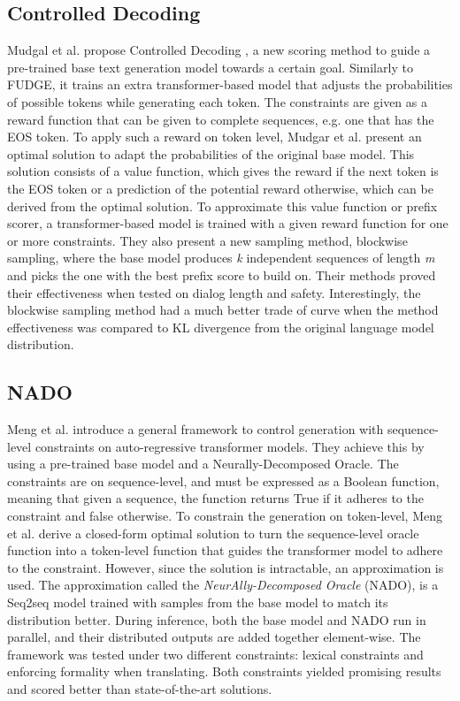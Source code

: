 \subsection{Controlled Decoding}
Mudgal et al. propose Controlled Decoding \cite{mudgal_controlled_2023}, a new scoring method to guide a pre-trained base text generation model towards a certain goal. Similarly to FUDGE, it trains an extra transformer-based model that adjusts the probabilities of possible tokens while generating each token. The constraints are given as a reward function that can be given to complete sequences, e.g. one that has the EOS token. To apply such a reward on token level, Mudgar et al. present an optimal solution to adapt the probabilities of the original base model. This solution consists of a value function, which gives the reward if the next token is the EOS token or a prediction of the potential reward otherwise, which can be derived from the optimal solution. To approximate this value function or prefix scorer, a transformer-based model is trained with a given reward function for one or more constraints. They also present a new sampling method, blockwise sampling, where the base model produces \textit{k} independent sequences of length \textit{m} and picks the one with the best prefix score to build on. Their methods proved their effectiveness when tested on dialog length and safety. Interestingly, the blockwise sampling method had a much better trade of curve when the method effectiveness was compared to KL divergence from the original language model distribution. 

\subsection{NADO}
Meng et al. \cite{meng_controllable_2022} introduce a general framework to control generation with sequence-level constraints on auto-regressive transformer models. They achieve this by using a pre-trained base model and a Neurally-Decomposed Oracle. The constraints are on sequence-level, and must be expressed as a Boolean function, meaning that given a sequence, the function returns True if it adheres to the constraint and false otherwise. To constrain the generation on token-level, Meng et al. derive a closed-form optimal solution to turn the sequence-level oracle function into a token-level function that guides the transformer model to adhere to the constraint. However, since the solution is intractable, an approximation is used. The approximation called the \textit{ NeurAlly-Decomposed Oracle} (NADO), is a Seq2seq model trained with samples from the base model to match its distribution better. During inference, both the base model and NADO run in parallel, and their distributed outputs are added together element-wise. The framework was tested under two different constraints: lexical constraints and enforcing formality when translating. Both constraints yielded promising results and scored better than state-of-the-art solutions. 

